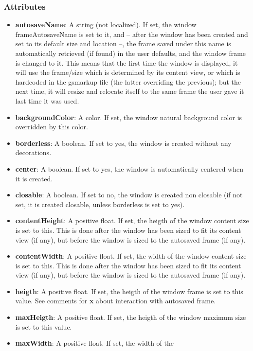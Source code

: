 \subsubsection{Attributes}
\begin{itemize}
\item {\bf autosaveName}: A string (not localized).  If set, the
  window frameAutosaveName is set to it, and -- after the window has
  been created and set to its default size and location --, the frame
  saved under this name is automatically retrieved (if found) in the
  user defaults, and the window frame is changed to it.  This means
  that the first time the window is displayed, it will use the
  frame/size which is determined by its content view, or which is
  hardcoded in the gsmarkup file (the latter overriding the previous);
  but the next time, it will resize and relocate itself to the same
  frame the user gave it last time it was used.
\item {\bf backgroundColor}: A color.  If set, the window natural
  background color is overridden by this color.
\item {\bf borderless}: A boolean.  If set to yes, the window is
  created without any decorations.
\item {\bf center}: A boolean.  If set to yes, the window is
  automatically centered when it is created.
\item {\bf closable}: A boolean.  If set to no, the window is created
  non closable (if not set, it is created closable, unless borderless
  is set to yes).
\item {\bf contentHeight}: A positive float.  If set, the heigth of
  the window content size is set to this.  This is done after the
  window has been sized to fit its content view (if any), but before
  the window is sized to the autosaved frame (if any).
\item {\bf contentWidth}: A positive float.  If set, the width of the
  window content size is set to this.  This is done after the window
  has been sized to fit its content view (if any), but before the
  window is sized to the autosaved frame (if any).
\item {\bf heigth}: A positive float.  If set, the heigth of the
  window frame is set to this value.  See comments for {\bf x} about
  interaction with autosaved frame.
\item {\bf maxHeigth}: A positive float.  If set, the heigth of the
  window maximum size is set to this value.
\item {\bf maxWidth}: A positive float.  If set, the width of the

\end{itemize}
